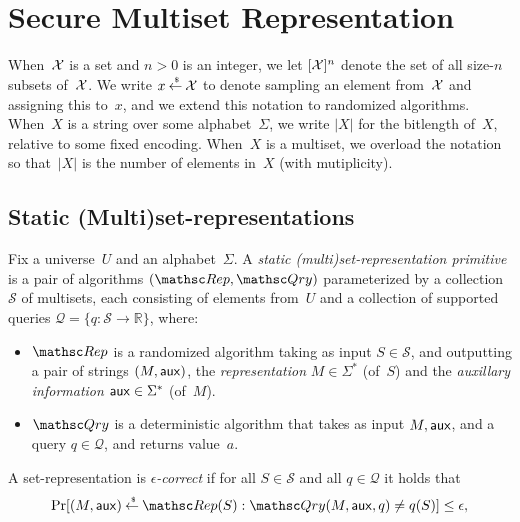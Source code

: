\section{Secure Multiset Representation}
\def\pub{{\sf pub}}
\def\aux{{\sf aux}}

When~${\cal X}$ is a set and $n>0$ is an integer, we let $[{\cal X}]^n$ denote the set of all size-$n$ subsets of~${\cal X}$. We write $x {\:\stackrel{{\scriptscriptstyle \hspace{0.2em}\$}} {\leftarrow}\:} {\cal X}$ to denote sampling an element from~${\cal X}$ and assigning this to~$x$, and we extend this notation to randomized algorithms.  When~$X$ is a string over some alphabet~$\Sigma$, we write $|X|$ for the bitlength of~$X$, relative to some fixed encoding.  When~$X$ is a multiset, we overload the notation so that~$|X|$ is the number of elements in~$X$ (with mutiplicity).

\subsection{Static (Multi)set-representations}
\begin{definition} %
Fix a universe~$U$ and an alphabet~$\Sigma$.  A \emph{static (multi)set-representation primitive} is a pair of algorithms $(\Rep, \Qry)$
parameterized by a collection $\mathcal{S}$ of multisets, each consisting of elements from~$U$ and a collection
of supported queries $\mathcal{Q}=\{q \colon \mathcal{S} \to \mathbb{R}\}$, where:
\begin{itemize}
\item $\Rep$ is a randomized algorithm taking as input $S \in \mathcal{S}$,
and outputting a pair of strings $(M,\aux)$, the \emph{representation} $M \in \Sigma^*$ (of~$S$) 
and the \emph{auxillary information} $\aux \in \Sigma^*$ (of~$M$).
\item $\Qry$ is a deterministic algorithm that takes as input $M, \aux$,
and a query $q\in \mathcal{Q}$, and returns value~$a$.
\end{itemize}
A set-representation is \emph{$\epsilon$-correct} if for all $S \in \mathcal{S}$ and
all $q \in \mathcal{Q}$ it holds that
\begin{eqnarray}
\Pr[(M,\aux) \getsr \Rep(S) : \Qry(M, \aux, q) \neq q(S)] \leq \epsilon, \label{eqn:correctness}
\end{eqnarray}
\end{definition}

